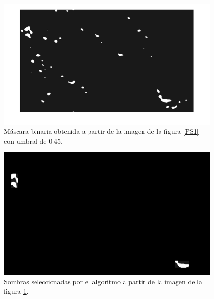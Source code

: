 \begin{figure}[h!]
    \includegraphics[width=\textwidth]{Imagenes/Homomorfico/PS1_bin.png}
     \hfill
     \caption{Máscara binaria obtenida a partir de la imagen de la figura \ref{PS1} con umbral de 0,45.}
    \label{mascaraPS1}
\end{figure}

\begin{figure}[h!]
    \includegraphics[width=\textwidth]{Imagenes/Homomorfico/PS1_masked.png}
     \hfill
     \caption{Sombras seleccionadas por el algoritmo a partir de la imagen de la figura \ref{mascaraPS1}.}
    \label{seleccionadaPS1}
\end{figure}